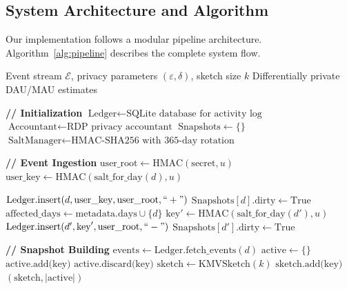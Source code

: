 \documentclass[11pt]{article}
\begin{document}
\subsection{System Architecture and Algorithm}

Our implementation follows a modular pipeline architecture. Algorithm~\ref{alg:pipeline} describes the complete system flow.

\begin{algorithm}[H]
\caption{DP-DAU/MAU Pipeline with Deletion Support}
\label{alg:pipeline}
\begin{algorithmic}[1]
\Require Event stream $\mathcal{E}$, privacy parameters $(\varepsilon, \delta)$, sketch size $k$
\Ensure Differentially private DAU/MAU estimates

\Statex \textbf{// Initialization}
\State $\text{Ledger} \gets \text{SQLite database for activity log}$
\State $\text{Accountant} \gets \text{RDP privacy accountant}$
\State $\text{Snapshots} \gets \{\}$ 
\State $\text{SaltManager} \gets \text{HMAC-SHA256 with 365-day rotation}$

\Statex
\Statex \textbf{// Event Ingestion}
    \State $\text{user\_root} \gets \text{HMAC}(\text{secret}, u)$ 
    \State $\text{user\_key} \gets \text{HMAC}(\text{salt\_for\_day}(d), u)$ 
    
        \State $\text{Ledger.insert}(d, \text{user\_key}, \text{user\_root}, ``+")$
        \State $\text{Snapshots}[d].\text{dirty} \gets \text{True}$
        \State $\text{affected\_days} \gets \text{metadata.days} \cup \{d\}$
            \State $\text{key}' \gets \text{HMAC}(\text{salt\_for\_day}(d'), u)$
            \State $\text{Ledger.insert}(d', \text{key}', \text{user\_root}, ``-")$ 
            \State $\text{Snapshots}[d'].\text{dirty} \gets \text{True}$
        \EndFor
    \EndIf
\EndFunction

\Statex
\Statex \textbf{// Snapshot Building}
    \State $\text{events} \gets \text{Ledger.fetch\_events}(d)$
    \State $\text{active} \gets \{\}$
         $\text{active.add(key)}$
        \Else{} $\text{active.discard(key)}$
        \EndIf
    \EndFor
    \State $\text{sketch} \gets \text{KMVSketch}(k)$
        \State $\text{sketch.add(key)}$
    \EndFor
    \State \Return $(\text{sketch}, |\text{active}|)$
\EndFunction


\end{algorithmic}
\end{algorithm}
\end{document}
